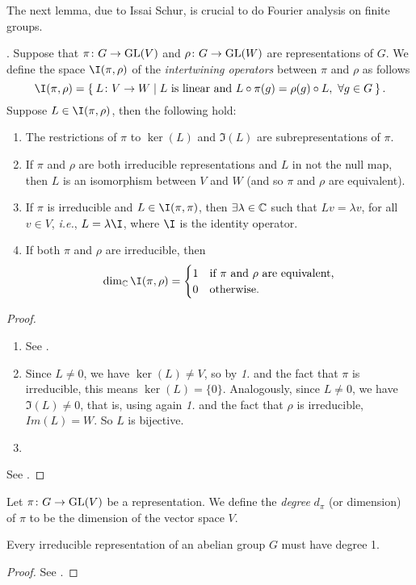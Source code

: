 The next lemma, due to Issai Schur, is crucial to do Fourier analysis on finite groups.
\begin{lemma}.
Suppose that $\pi\colon G\rightarrow \operatorname{GL}(V)$ and $\rho\colon G\rightarrow \operatorname{GL}(W)$ are representations of $G$. We define the space $\I(\pi,\rho)$ of the \emph{intertwining operators} between $\pi$ and $\rho$ as follows
\[
\I(\pi,\rho)=\Set{L\colon V\rightarrow W | L \text{ is linear and } L\circ \pi(g)= \rho(g)\circ L , \ \forall g\in G}.
\]
Suppose $L\in \I(\pi,\rho)$, then the following hold:
\begin{enumerate}
\item The restrictions of $\pi$ to $\ker(L)$ and $\Im(L)$ are subrepresentations of $\pi$.
\item If $\pi$ and $\rho$ are both irreducible representations and $L$ in not the null map, then $L$ is an isomorphism between $V$ and $W$ (and so $\pi$ and $\rho$ are equivalent).
\item If $\pi$ is irreducible and $L\in \I(\pi,\pi)$,  then $\exists \lambda \in {\mathbb C}$ such that $Lv=\lambda v$, for all $v\in V$, \emph{i.e.}, $L=\lambda\I$, where $\I$ is the identity operator.
\item If both $\pi$ and $\rho$ are irreducible, then 
\[
\dim_\C\I(\pi, \rho)=
\begin{cases}
1 &\text{if $\pi$ and $\rho$ are equivalent,} \\
0 &\text{otherwise.}
\end{cases}
\]
\end{enumerate}
\end{lemma}
\begin{proof}
\begin{enumerate}
\item See \cite[p. 248]{terras_1999}.
\item Since $L\neq 0$, we have $\ker(L)\neq V$, so by \emph{1.} and the fact that $\pi$ is irreducible, this means $\ker(L)=\{0\}$. Analogously, since $L\neq 0$, we have $\Im(L)\neq 0$, that is, using again \emph{1.} and the fact that $\rho$ is irreducible, $Im(L)=W$. So $L$ is bijective.
\item 
\end{enumerate}
See \cite[p. 248]{terras_1999}.
\end{proof}
\begin{defn}
Let $\pi\colon G \rightarrow \operatorname{GL}(V)$ be a representation. We define the \emph{degree} $d_{\pi}$ (or dimension) of $\pi$ to be the dimension of the vector space $V$.
\end{defn}
\begin{cor}
Every irreducible representation of an abelian group $G$ must have degree 1.
\end{cor}
\begin{proof}
See \cite{terras_1999}.
\end{proof}
